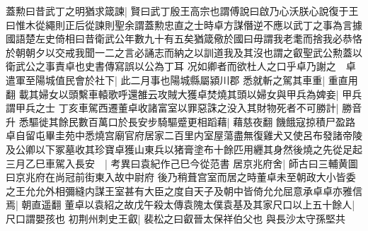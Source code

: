 蓋勲曰昔武丁之明猶求箴諫|{
	賢曰武丁殷王高宗也謂傅說曰啟乃心沃朕心說復于王曰惟木從繩則正后從諫則聖余謂蓋勲忠直之士時卓方謀僭逆不應以武丁之事為言據國語楚左史倚相曰昔衛武公年數九十有五矣猶箴儆於國曰毋謂我老耄而捨我必恭恪於朝朝夕以交戒我聞一二之言必誦志而納之以訓道我及其沒也謂之叡聖武公勲蓋以衛武公之事責卓也史書傳寫誤以公為丁耳}
况如卿者而欲杜人之口乎卓乃謝之　卓遣軍至陽城值民會於社下|{
	此二月事也陽城縣屬潁川郡}
悉就斬之駕其車重|{
	重直用翻}
載其婦女以頭繫車轅歌呼還雒云攻賊大獲卓焚燒其頭以婦女與甲兵為婢妾|{
	甲兵謂甲兵之士}
丁亥車駕西遷董卓收諸富室以罪惡誅之没入其財物死者不可勝計|{
	勝音升}
悉驅徙其餘民數百萬口於長安步騎驅蹙更相蹈藉|{
	藉慈夜翻}
饑餓寇掠積尸盈路卓自留屯畢圭苑中悉燒宫廟官府居家二百里内室屋蕩盡無復雞犬又使呂布發諸帝陵及公卿以下冢墓收其珍寶卓獲山東兵以猪膏塗布十餘匹用纒其身然後燒之先從足起　三月乙巳車駕入長安　|{
	考異曰袁紀作己巳今從范書}
居京兆府舍|{
	師古曰三輔黄圖曰京兆府在尚冠前街東入故中尉府}
後乃稍葺宫室而居之時董卓未至朝政大小皆委之王允允外相彌縫内謀王室甚有大臣之度自天子及朝中皆倚允允屈意承卓卓亦雅信焉|{
	朝直遥翻}
董卓以袁紹之故戊午殺太傳袁隗太僕袁基及其家尺口以上五十餘人|{
	尺口謂嬰孩也}
初荆州刺史王叡|{
	裴松之曰叡晉太保祥伯父也}
與長沙太守孫堅共

